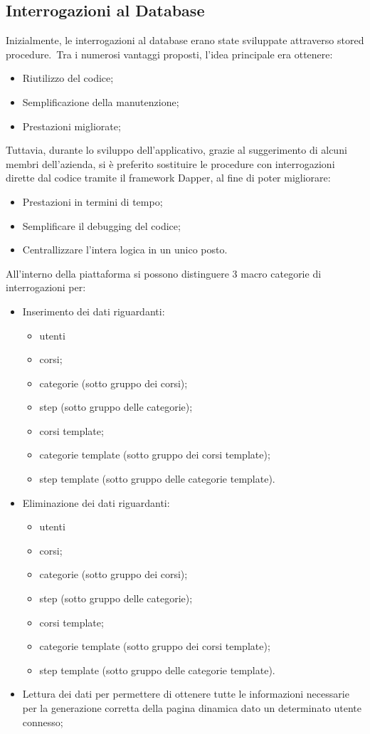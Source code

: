 \subsection{Interrogazioni al Database}
Inizialmente, le interrogazioni al database erano state sviluppate attraverso
stored procedure.\ Tra i numerosi vantaggi proposti, l'idea principale era ottenere:
\begin{itemize}
	\item Riutilizzo del codice;
	\item Semplificazione della manutenzione;
	\item Prestazioni migliorate;
\end{itemize}
Tuttavia, durante lo sviluppo dell'applicativo, grazie al suggerimento di alcuni membri
dell'azienda, si è preferito sostituire le procedure con interrogazioni dirette dal codice
tramite il framework Dapper, al fine di poter migliorare:
\begin{itemize}
	\item Prestazioni in termini di tempo;
	\item Semplificare il debugging del codice;
	\item Centrallizzare l'intera logica in un unico posto.
\end{itemize}
All'interno della piattaforma si possono distinguere 3 macro categorie di interrogazioni per:
\begin{itemize}
	\item Inserimento dei dati riguardanti:
		\begin{itemize}
			\item utenti
			\item corsi;
			\item categorie (sotto gruppo dei corsi);
			\item step (sotto gruppo delle categorie);
			\item corsi template;
			\item categorie template (sotto gruppo dei corsi template);
			\item step template (sotto gruppo delle categorie template).
		\end{itemize}
	\item Eliminazione dei dati riguardanti:
		\begin{itemize}
			\item utenti
			\item corsi;
			\item categorie (sotto gruppo dei corsi);
			\item step (sotto gruppo delle categorie);
			\item corsi template;
			\item categorie template (sotto gruppo dei corsi template);
			\item step template (sotto gruppo delle categorie template).
		\end{itemize}
	\item Lettura dei dati per permettere di ottenere tutte le informazioni necessarie
		per la generazione corretta della pagina dinamica dato un determinato utente
		connesso;
\end{itemize}
%
